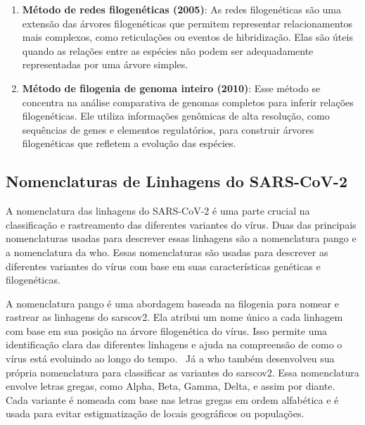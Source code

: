 \begin{enumerate}
  \item \textbf{Método de redes filogenéticas (2005)}: As redes filogenéticas são uma extensão das árvores filogenéticas que permitem representar relacionamentos mais complexos, como reticulações ou eventos de hibridização. Elas são úteis quando as relações entre as espécies não podem ser adequadamente representadas por uma árvore simples.~\cite{huson_phylogenetic_networks_2006}
  \item \textbf{Método de filogenia de genoma inteiro (2010)}: Esse método se concentra na análise comparativa de genomas completos para inferir relações filogenéticas. Ele utiliza informações genômicas de alta resolução, como sequências de genes e elementos regulatórios, para construir árvores filogenéticas que refletem a evolução das espécies.~\cite{eisen_horizontal_gene_transfre_2000}
\end{enumerate}

\subsection{Nomenclaturas de Linhagens do SARS-CoV-2}
A nomenclatura das linhagens do SARS-CoV-2 é uma parte crucial na classificação e rastreamento das diferentes variantes do vírus. Duas das principais nomenclaturas usadas para descrever essas linhagens são a nomenclatura \gls{pango} e a nomenclatura da \gls{who}. Essas nomenclaturas são usadas para descrever as diferentes variantes do vírus com base em suas características genéticas e filogenéticas.

A nomenclatura \gls{pango} é uma abordagem baseada na filogenia para nomear e rastrear as linhagens do \gls{sarscov2}. Ela atribui um nome único a cada linhagem com base em sua posição na árvore filogenética do vírus. Isso permite uma identificação clara das diferentes linhagens e ajuda na compreensão de como o vírus está evoluindo ao longo do tempo.~\cite{pango_rambaut_2020} Já a \gls{who} também desenvolveu sua própria nomenclatura para classificar as variantes do \gls{sarscov2}. Essa nomenclatura envolve letras gregas, como Alpha, Beta, Gamma, Delta, e assim por diante. Cada variante é nomeada com base nas letras gregas em ordem alfabética e é usada para evitar estigmatização de locais geográficos ou populações.~\cite{who_variants}

